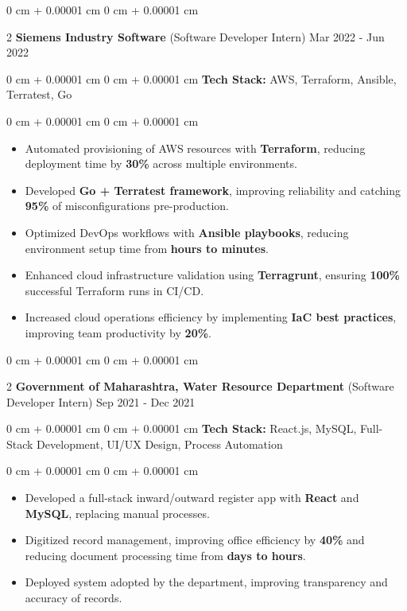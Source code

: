 \documentclass[9pt, letterpaper]{article}
\newenvironment{highlights}{
    \begin{itemize}[
        topsep=0.05 cm,
        parsep=0 pt,
        partopsep=0pt,
        itemsep=0pt,
        leftmargin=10pt
    ]
}{
    \end{itemize}
} %
\newenvironment{onecolentry}{
    \begin{adjustwidth}{
        0 cm + 0.00001 cm}{
        0 cm + 0.00001 cm}
}{
    \end{adjustwidth}
} %
\newenvironment{twocolentry}[2][]{
    \onecolentry
    \def\secondColumn{#2}
    \setcolumnwidth{\fill, 4.5 cm}
    \begin{paracol}{2}
}{
    \switchcolumn \raggedleft \secondColumn
    \end{paracol}
    \endonecolentry
} %
\begin{document}
    \begin{twocolentry}{Mar 2022 - Jun 2022}\textbf{Siemens Industry Software} (Software Developer Intern)\end{twocolentry}
    \begin{onecolentry}\textbf{Tech Stack:} AWS, Terraform, Ansible, Terratest, Go \end{onecolentry}
    \begin{onecolentry}
        \begin{highlights}
            \item Automated provisioning of AWS resources with \textbf{Terraform}, reducing deployment time by \textbf{30\%} across multiple environments.
            \item Developed \textbf{Go + Terratest framework}, improving reliability and catching \textbf{95\%} of misconfigurations pre-production.
            \item Optimized DevOps workflows with \textbf{Ansible playbooks}, reducing environment setup time from \textbf{hours to minutes}.
            \item Enhanced cloud infrastructure validation using \textbf{Terragrunt}, ensuring \textbf{100\%} successful Terraform runs in CI/CD.
            \item Increased cloud operations efficiency by implementing \textbf{IaC best practices}, improving team productivity by \textbf{20\%}.
        \end{highlights}
    \end{onecolentry}

    \begin{twocolentry}{Sep 2021 - Dec 2021}\textbf{Government of Maharashtra, Water Resource Department} (Software Developer Intern)\end{twocolentry}
    \begin{onecolentry}\textbf{Tech Stack:} React.js, MySQL, Full-Stack Development, UI/UX Design, Process Automation\end{onecolentry}
    \begin{onecolentry}
        \begin{highlights}
           \item Developed a full-stack inward/outward register app with \textbf{React} and \textbf{MySQL}, replacing manual processes.
           \item Digitized record management, improving office efficiency by \textbf{40\%} and reducing document processing time from \textbf{days to hours}.
           \item Deployed system adopted by the department, improving transparency and accuracy of records.
        \end{highlights}
    \end{onecolentry}
\end{document}
